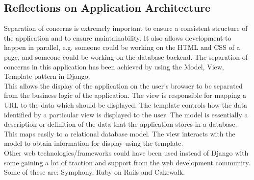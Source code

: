 \documentclass{sig-alt-release2}
\begin{document}

\subsection{Reflections on Application Architecture}
Separation of concerns is extremely important to ensure a consistent structure of the application and to ensure maintainability. It also allows development to happen in parallel, e.g. someone could be working on the HTML and CSS of a page, and someone could be working on the database backend. The separation of concerns in this application has been achieved by using the Model, View, Template pattern in Django. \\

This allows the display of the application on the user's browser to be separated from the business logic of the application. The view is responsible for mapping a URL to the data which should be displayed. The template controls how the data identified by a particular view is displayed to the user. The model is essentially a description or definition of the data that the application stores in a database. This maps easily to a relational database model. The view interacts with the model to obtain information for display using the template. \\

Other web technologies/frameworks could have been used instead of Django with some gaining a lot of traction and support from the web development community. Some of these are: Symphony, Ruby on Rails and Cakewalk. \\
\end{document}
